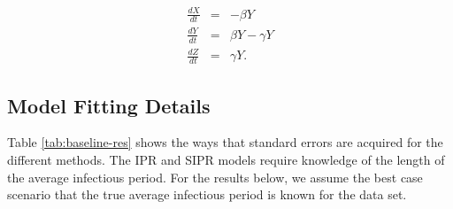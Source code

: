 \documentclass[12pt]{article}
\newcommand{\rr}{\ensuremath{\mathcal{R}_0}}
\begin{document}
\begin{eqnarray*}
	\frac{dX}{dt} &=& -\beta Y \\
	\frac{dY}{dt} &=& \beta Y - \gamma Y \\
	\frac{dZ}{dt} &=& \gamma Y.
\end{eqnarray*}


	
	
	
	
	
	
	
	
	


\subsection{Model Fitting Details}\label{sec:model-fit}

Table \ref{tab:baseline-res} shows the ways that standard errors are acquired for the different methods. The IPR and SIPR models require knowledge of the length of the average infectious period. For the results below, we assume the best case scenario that the true average infectious period is known for the data set.
\end{document}

